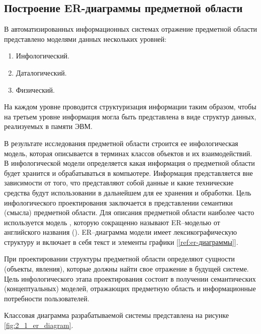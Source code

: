 \documentclass[../nirs.tex]{subfiles}
\begin{document}
\subsection{Построение ER-диаграммы предметной области}
В автоматизированных информационных системах отражение предметной области
представлено моделями данных нескольких уровней:
\begin{enumerate}
	\item Инфологический.
	\item Даталогический.
	\item Физический.
\end{enumerate}

На каждом уровне проводится структуризация информации таким образом, чтобы на
третьем уровне информация могла быть представлена в виде структур данных,
реализуемых в памяти ЭВМ.

В результате исследования предметной области строится ее инфологическая модель,
которая описывается в терминах классов объектов и их взаимодействий. В
инфологической модели определяется какая информация о предметной области будет
хранится и обрабатываться в компьютере. Информация представляется вне
зависимости от того, что представляют собой данные и какие технические средства
будут использовании в дальнейшем для ее хранения и обработки. Цель инфологического
проектирования заключается в представлении семантики (смысла) предметной
области. Для описания предметной области наиболее часто используется модель
, которую сокращенно называют ER–моделью от
английского названия  (). ER–диаграмма модели имеет лексикографическую структуру и включает в
себя текст и элементы графики [\ref{ref:er-диаграммы}].

При проектировании структуры предметной области определяют сущности (объекты,
явления), которые должны найти свое отражение в будущей системе.
Цель инфологического этапа проектирования состоит в получении семантических
(концептуальных) моделей, отражающих предметную область и информационные
потребности пользователей.

Классовая диаграмма разрабатываемой системы представлена на рисунке
\ref{fig:2_1_er_diagram}.
\end{document}
